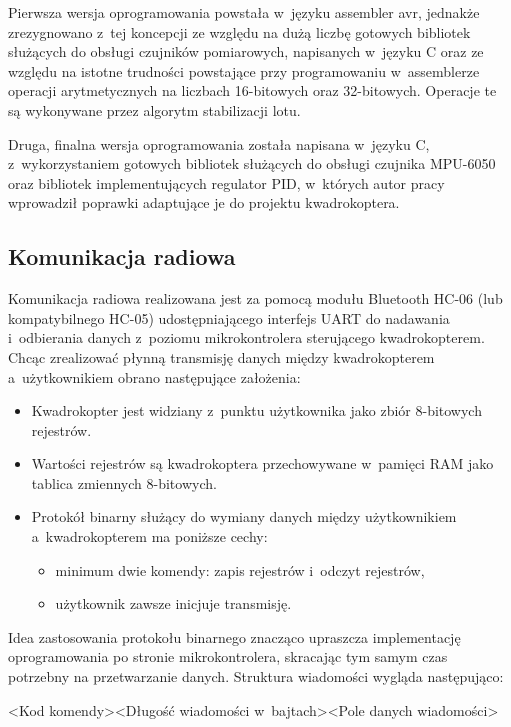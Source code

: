 \documentclass[11pt, twoside]{Thesis} %
\begin{document}
Pierwsza wersja oprogramowania powstała w~języku assembler avr, jednakże zrezygnowano z~tej koncepcji ze względu na dużą liczbę gotowych bibliotek służących do obsługi czujników pomiarowych, napisanych w~języku C oraz ze względu na istotne trudności powstające przy programowaniu w~assemblerze operacji arytmetycznych na liczbach 16-bitowych oraz 32-bitowych. Operacje te są wykonywane przez algorytm stabilizacji lotu. 

Druga, finalna wersja oprogramowania została napisana w~języku C, z~wykorzystaniem gotowych bibliotek służących do obsługi czujnika MPU-6050 oraz bibliotek implementujących regulator PID, w~których autor pracy wprowadził poprawki adaptujące je do projektu kwadrokoptera.


\subsection{Komunikacja radiowa}

Komunikacja radiowa realizowana jest za pomocą modułu Bluetooth HC-06 (lub kompatybilnego HC-05) udostępniającego interfejs UART do nadawania i~odbierania danych z~poziomu mikrokontrolera sterującego kwadrokopterem.
Chcąc zrealizować płynną transmisję danych między kwadrokopterem a~użytkownikiem obrano następujące założenia:
\begin{itemize}
	\item Kwadrokopter jest widziany z~punktu użytkownika jako zbiór 8-bitowych rejestrów.
	\item Wartości rejestrów są kwadrokoptera przechowywane w~pamięci RAM jako tablica zmiennych 8-bitowych.
	\item Protokół binarny służący do wymiany danych między użytkownikiem a~kwadrokopterem ma poniższe cechy:
	\begin{itemize}
		\item minimum dwie komendy: zapis rejestrów i~odczyt rejestrów,
		\item użytkownik zawsze inicjuje transmisję.
	\end{itemize} 
\end{itemize}

Idea zastosowania protokołu binarnego znacząco upraszcza implementację oprogramowania po stronie mikrokontrolera, skracając tym samym czas potrzebny na przetwarzanie danych. Struktura wiadomości wygląda następująco:

<Kod komendy><Długość wiadomości w~bajtach><Pole danych wiadomości>
\end{document}
